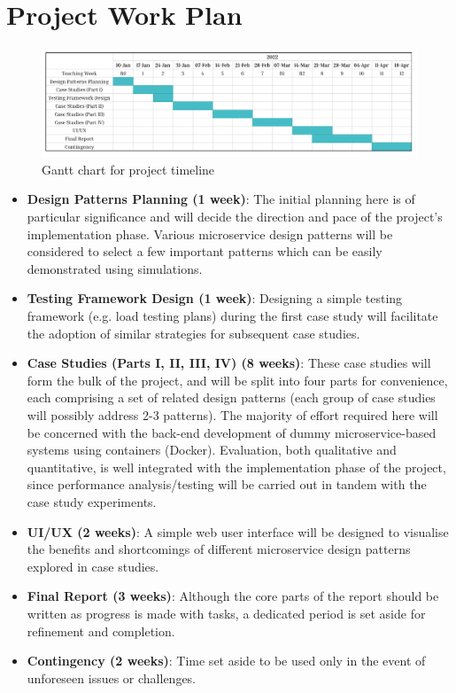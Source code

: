 \section{Project Work Plan}

\begin{figure}[h]
  \centering
  \includegraphics[width=0.85\linewidth]{./assets/images/work-plan-gantt.pdf}
  \caption{Gantt chart for project timeline}
  \label{fig:work-plan-gantt}
\end{figure}

\begin{itemize}
  \item \textbf{Design Patterns Planning (1 week)}: The initial planning here is of particular significance
        and will decide the direction and pace of the project's implementation phase. Various microservice design
        patterns will be considered to select a few important patterns which can be easily demonstrated using
        simulations.

  \item \textbf{Testing Framework Design (1 week)}: Designing a simple testing framework (e.g. load testing plans)
        during the first case study will facilitate the adoption of similar strategies for subsequent case studies.

  \item \textbf{Case Studies (Parts I, II, III, IV) (8 weeks)}: These case studies will form the bulk of the
        project, and will be split into four parts for convenience, each comprising a set of related design patterns
        (each group of case studies will possibly address 2-3 patterns). The majority of effort required here will be
        concerned with the back-end development of dummy microservice-based systems using containers (Docker).
        Evaluation, both qualitative and quantitative, is well integrated with the implementation phase of the project,
        since performance analysis/testing will be carried out in tandem with the case study experiments.

  \item \textbf{UI/UX (2 weeks)}: A simple web user interface will be designed to visualise the benefits and
        shortcomings of different microservice design patterns explored in case studies.

  \item \textbf{Final Report (3 weeks)}: Although the core parts of the report should be written as progress is made
        with tasks, a dedicated period is set aside for refinement and completion.

  \item \textbf{Contingency (2 weeks)}: Time set aside to be used only in the event of unforeseen issues or challenges.
\end{itemize}

